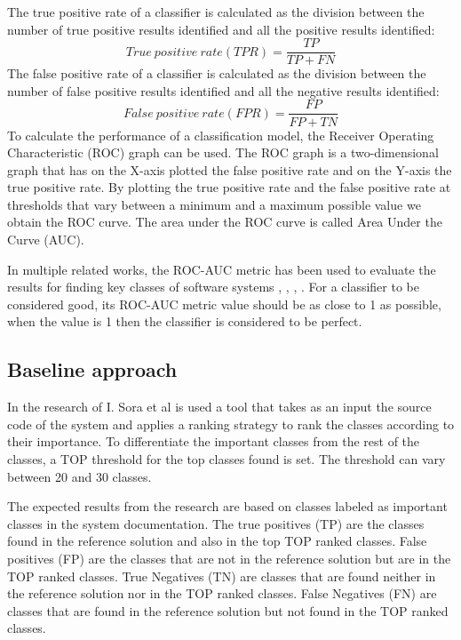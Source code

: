 \documentclass[12pt]{mitthesis}
\begin{document}
The true positive rate of a classifier is calculated as the division between the number of true positive results identified and all the positive results identified:
\[ True\ positive\ rate (TPR)
  = \dfrac{TP}{TP+FN}
\]
The false positive rate of a classifier is calculated as the division between the number of false positive results identified and all the negative results identified:
\[ False\ positive\ rate (FPR)
  = \dfrac{FP}{FP+TN}
\]
To calculate the performance of a classification model, the Receiver Operating Characteristic (ROC) graph can be used. The ROC graph is a two-dimensional graph that has on the X-axis plotted the false positive rate and on the Y-axis the true positive rate. By plotting the true positive rate and the false positive rate at thresholds that vary between a minimum and a maximum possible value we obtain the ROC curve. The area under the ROC curve is called Area Under the Curve (AUC).

In multiple related works, the ROC-AUC metric has been used to evaluate the results for finding key classes of software systems \cite{6676885}, \cite{Finding-key-classes}, \cite{rocclasification}, \cite{7551990}.
For a classifier to be considered good, its ROC-AUC metric value should be as close to 1 as possible, when the value is 1 then the classifier is considered to be perfect.


\subsection{Baseline approach}
\label{sec:previous_measurements}

In the research of I. Sora et al \cite{Finding-key-classes} is used a tool that takes as an input the source code of the system and applies a ranking strategy to rank the classes according to their importance. To differentiate the important classes from the rest of the classes, a TOP threshold for the top classes found is set. The threshold can vary between 20 and 30 classes.

The expected results from the research are based on classes labeled as important classes in the system documentation.
The true positives (TP) are the classes found in the reference solution and also in the top TOP ranked classes. False positives (FP) are the classes that are not in the reference solution but are in the TOP ranked classes.
True Negatives (TN) are classes that are found neither in the reference solution nor in the TOP ranked classes. False Negatives (FN) are classes that are found in the reference solution but not found in the TOP ranked classes.
\end{document}
